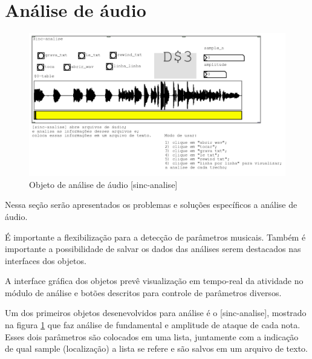 \documentclass{ppgmus}
\begin{document}






\section{Análise de áudio}

\begin{figure}
\includegraphics[scale=.6]{sinc-analise}
\caption{Objeto de análise de áudio [sinc-analise]}
\label{sinc-analise}
\end{figure}


Nessa seção serão apresentados os problemas e soluções específicos
a análise de áudio. 

É importante a flexibilização para a detecção de parâmetros musicais.
Também é importante a possibilidade de salvar os dados das análises serem
destacados nas interfaces dos objetos.

A interface gráfica dos objetos prevê visualização em tempo-real
da atividade no módulo de análise e botões descritos para controle
de parâmetros diversos.

Um dos primeiros objetos desenevolvidos para análise é o [sinc-analise],
mostrado na figura \ref{sinc-analise} que faz análise de fundamental e amplitude
de ataque de cada nota. Esses dois parâmetros são colocados em uma lista, juntamente com a indicação
de qual sample (localização) a lista se refere e são salvos em um arquivo de texto.
\end{document}
